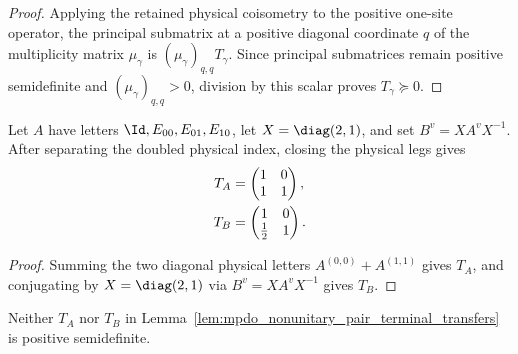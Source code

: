 \begin{proof}\leanok
    Applying the retained physical coisometry to the positive one-site
    operator, the principal submatrix at a positive diagonal coordinate $q$
    of the multiplicity matrix $\mu_\gamma$ is $(\mu_\gamma)_{q,q}T_\gamma$.
    Since principal submatrices remain positive semidefinite and
    $(\mu_\gamma)_{q,q}>0$, division by this scalar proves
    $T_\gamma\succeq0$.
\end{proof}

\begin{lemma}%
    \label{lem:mpdo_nonunitary_pair_terminal_transfers}
    \leanok
    Let $A$ have letters $\Id,E_{00},E_{01},E_{10}$, let
    $X=\diag(2,1)$, and set $B^v=XA^vX^{-1}$. After separating the doubled
    physical index, closing the physical legs gives
    \begin{align}
        T_A & =\begin{pmatrix}1&0\\1&1\end{pmatrix},
        \notag                                              \\
        T_B & =\begin{pmatrix}1&0\\\tfrac12&1\end{pmatrix}.
        \notag
    \end{align}
\end{lemma}

\begin{proof}\leanok
    Summing the two diagonal physical letters $A^{(0,0)}+A^{(1,1)}$ gives
    $T_A$, and conjugating by $X=\diag(2,1)$ via $B^v=XA^vX^{-1}$ gives
    $T_B$.
\end{proof}

\begin{lemma}%
    \label{lem:mpdo_nonunitary_pair_terminal_not_positive}
    \leanok
    Neither $T_A$ nor $T_B$ in
    Lemma~\ref{lem:mpdo_nonunitary_pair_terminal_transfers} is positive
    semidefinite.
\end{lemma}

